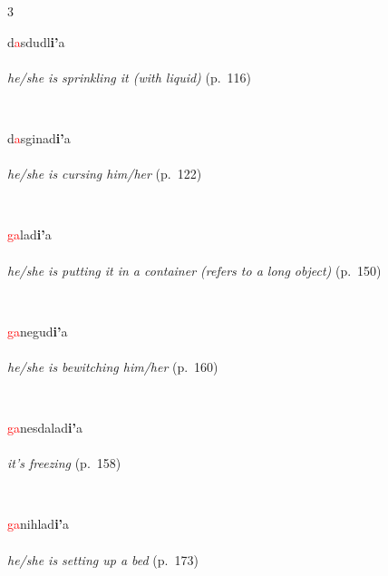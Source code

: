 \documentclass[oneside,openany]{book}%
\begin{document}
\begin{multicols}{3}
\begin{minipage}[t]{\linewidth}
\raggedright\noindent d\textcolor{Red}{a}sdudl\textbf{i'}a\\
\\
\noindent \textit{he/she is sprinkling it (with liquid)} (p.~116)
\end{minipage}\\[1em]%
\begin{minipage}[t]{\linewidth}
\raggedright\noindent d\textcolor{Red}{a}sginad\textbf{i'}a\\
\\
\noindent \textit{he/she is cursing him/her} (p.~122)
\end{minipage}\\[1em]%
\begin{minipage}[t]{\linewidth}
\raggedright\noindent \textcolor{Red}{ga}lad\textbf{i'}a\\
\\
\noindent \textit{he/she is putting it in a container (refers to a long object)} (p.~150)
\end{minipage}\\[1em]%
\begin{minipage}[t]{\linewidth}
\raggedright\noindent \textcolor{Red}{ga}negud\textbf{i'}a\\
\\
\noindent \textit{he/she is bewitching him/her} (p.~160)
\end{minipage}\\[1em]%
\begin{minipage}[t]{\linewidth}
\raggedright\noindent \textcolor{Red}{ga}nesdalad\textbf{i'}a\\
\\
\noindent \textit{it's freezing} (p.~158)
\end{minipage}\\[1em]%
\begin{minipage}[t]{\linewidth}
\raggedright\noindent \textcolor{Red}{ga}nihlad\textbf{i'}a\\
\\
\noindent \textit{he/she is setting up a bed} (p.~173)

\end{minipage}
\end{multicols}
\end{document}
